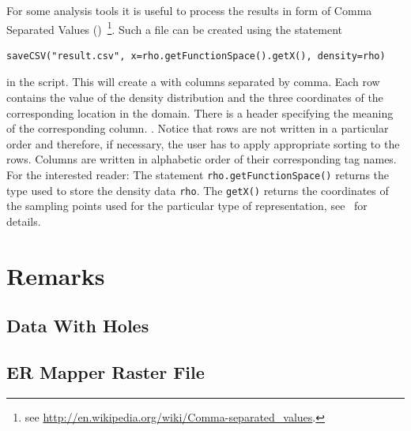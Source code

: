 For some analysis tools it is useful to process the results in form of Comma Separated Values (\CSV)~\footnote{see 
\url{http://en.wikipedia.org/wiki/Comma-separated_values}.}. Such a file can be created using the statement
\begin{verbatim}
saveCSV("result.csv", x=rho.getFunctionSpace().getX(), density=rho)
\end{verbatim}
in the script. This will create a  with columns separated by comma. Each row contains the value of the
density distribution and the three coordinates of the corresponding location in the domain. There is a header specifying 
the meaning of the corresponding column. . Notice that rows are not written in a particular 
order and therefore, if necessary, the user has to apply appropriate sorting to the rows.
Columns are written in alphabetic order of their corresponding tag names. For the interested reader: The 
statement \verb|rho.getFunctionSpace()| returns the type used to store the density data \verb|rho|.
The  \verb|getX()| returns the coordinates of the sampling points used for the particular type of
representation, see~\cite{ESCRIPT} for details. 


\section{Remarks}

\subsection{Data With Holes}\label{SEC:P1:GRAV:REMARK:DATAHOLES}


\subsection{ER Mapper Raster File}\label{SEC:P1:GRAV:REMARK:ERMAPPER}


